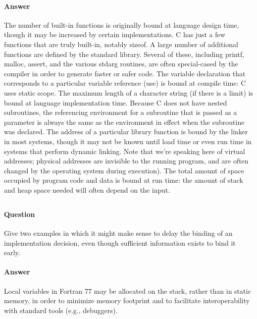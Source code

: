 \documentclass[5pt]{article}
\begin{document}
\paragraph{Answer}
The number of built-in functions is originally bound at language design time, though it may
be increased by certain implementations. C has just a few functions that are truly built-in,
notably sizeof. A large number of additional functions are defined by the standard library.
Several of these, including printf, malloc, assert, and the various stdarg routines, are
often special-cased by the compiler in order to generate faster or safer code.
The variable declaration that corresponds to a particular variable reference (use) is bound at
compile time: C uses static scope.
The maximum length of a character string (if there is a limit) is bound at language implementation
time.
Because C does not have nested subroutines, the referencing environment for a subroutine that
is passed as a parameter is always the same as the environment in effect when the subroutine
was declared.
The address of a particular library function is bound by the linker in most systems, though it
may not be known until load time or even run time in systems that perform dynamic linking.
Note that we’re speaking here of virtual addresses; physical addresses
are invisible to the running program, and are often changed by the operating system during
execution).
The total amount of space occupied by program code and data is bound at run time: the
amount of stack and heap space needed will often depend on the input.

\setcounter{subsection}{2}
\subsection{}

\paragraph{Question}
Give two examples in which it might make sense to delay the binding of an
implementation decision, even though sufficient information exists to bind
it early.


\paragraph{Answer}
Local variables in Fortran 77 may be allocated on the stack, rather than in static memory, in
order to minimize memory footprint and to facilitate interoperability with standard tools (e.g.,
debuggers).
\end{document}
